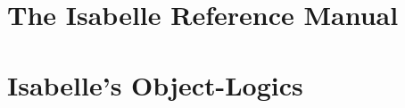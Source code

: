\part{The Isabelle Reference Manual} 










\part{Isabelle's Object-Logics} 
\newcommand\subcaption[1]{\par {\centering\normalsize\sc#1\par}\bigskip
  \hrule\bigskip}











 \small\raggedright\frenchspacing




